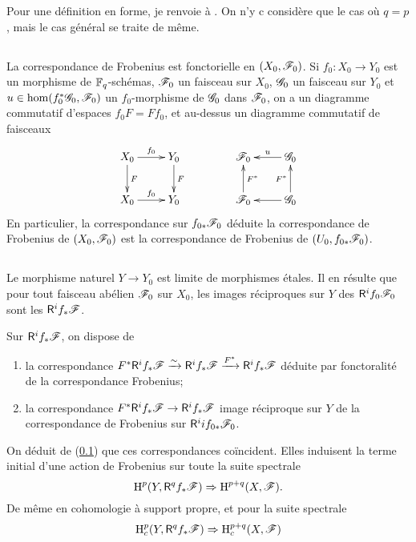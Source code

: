 \documentclass[oneside]{book}
\begin{document}
Pour une définition en forme, je renvoie à \cite[XI.1,2]{SGA5}. On n'y c
considère que le cas où $q=p$, mais le cas général se traite de même. 





\subsection{}\label{II:1-3}

La correspondance de Frobenius est fonctorielle en $(X_0,\mathscr{F}_0)$. Si 
$f_0:X_0\to Y_0$ est un morphisme de $\mathbb{F}_q$-schémas, $\mathscr{F}_0$ un faisceau sur 
$X_0$, $\mathscr{G}_0$ un faisceau sur $Y_0$ et $u\in\hom(f_0^*\mathscr{G}_0,\mathscr{F}_0)$ un 
$f_0$-morphisme de $\mathscr{G}_0$ dans $\mathscr{F}_0$, on a un diagramme commutatif d'espaces 
$f_0 F = F f_0$, et au-dessus un diagramme commutatif de faisceaux 
\[\xymatrix{
  X_0 \ar[r]^-{f_0} \ar[d]^-F
    & Y_0 \ar[d]^-F \\
  X_0 \ar[r]^-{f_0} 
    & Y_0
}\qquad\qquad
\xymatrix{
  \cF_0 
    & \ar[l]_-u \cG_0 \\
  \cF_0 \ar[u]_-{F^*} 
    & \ar[l] \cG_0 \ar[u]^-{F^*}
}\]
En particulier, la correspondance sur $f_{0*}\mathscr{F}_0$ déduite la correspondance 
de Frobenius de $(X_0,\mathscr{F}_0)$ est la correspondance de Frobenius de 
$(U_0,f_{0*}\mathscr{F}_0)$. 





\subsection{}\label{II:1-4}

Le morphisme naturel $Y\to Y_0$ est limite de morphismes étales. Il en 
résulte que pour tout faisceau abélien $\mathscr{F}_0$ sur $X_0$, les images 
réciproques sur $Y$ des $\mathsf{R}^if_0\mathscr{F}_0$ sont les $\mathsf{R}^if_*\mathscr{F}$. 

Sur $\mathsf{R}^if_*\mathscr{F}$, on dispose de 
\begin{enumerate}[\indent a)]
  \item la correspondance 
    $F^*\mathsf{R}^i f_*\mathscr{F} \xrightarrow\sim \mathsf{R}^i f_*\mathscr{F} \xrightarrow{F^*} \mathsf{R}^if_*\mathscr{F}$ déduite 
    par fonctoralité de la correspondance Frobenius; 
  \item la correspondance $F^*\mathsf{R}^if_*\mathscr{F}\to\mathsf{R}^if_*\mathscr{F}$ image réciproque sur 
    $Y$ de la correspondance de Frobenius sur $\mathsf{R}^ii f_{0*}\mathscr{F}_0$. 
\end{enumerate}

On déduit de (\ref{II:1-3}) que ces correspondances coïncident. Elles 
induisent la terme initial d'une action de Frobenius sur toute la suite 
spectrale 
\[
  \operatorname{H}^p(Y,\mathsf{R}^q f_*\mathscr{F}) \Rightarrow \operatorname{H}^{p+q}(X,\mathscr{F}) \text{.}
\]
De même en cohomologie à support propre, et pour la suite spectrale 
\[
  \operatorname{H}_c^p(Y,\mathsf{R}^q f_* \mathscr{F}) \Rightarrow \operatorname{H}_c^{p+q}(X,\mathscr{F})
\]
\end{document}
